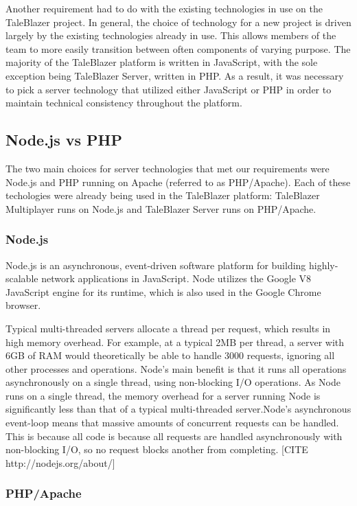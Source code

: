 Another requirement had to do with the existing technologies in use on the TaleBlazer project. In general, the choice of technology for a new project is driven largely by the existing technologies already in use. This allows members of the team to more easily transition between often components of varying purpose. The majority of the TaleBlazer platform is written in JavaScript, with the sole exception being TaleBlazer Server, written in PHP. As a result, it was necessary to pick a server technology that utilized either JavaScript or PHP in order to maintain technical consistency throughout the platform. 

\subsection{Node.js vs PHP}

The two main choices for server technologies that met our requirements were Node.js and PHP running on Apache (referred to as PHP/Apache). Each of these techologies were already being used in the TaleBlazer platform: TaleBlazer Multiplayer runs on Node.js and TaleBlazer Server runs on PHP/Apache. 

\subsubsection{Node.js}

Node.js is an asynchronous, event-driven software platform for building highly-scalable network applications in JavaScript. Node utilizes the Google V8 JavaScript engine for its runtime, which is also used in the Google Chrome browser. 

Typical multi-threaded servers allocate a thread per request, which results in high memory overhead. For example, at a typical 2MB per thread, a server with 6GB of RAM would theoretically be able to handle 3000 requests, ignoring all other processes and operations. Node's main benefit is that it runs all operations asynchronously on a single thread, using non-blocking I/O operations. As Node runs on a single thread, the memory overhead for a server running Node is significantly less than that of a typical multi-threaded server.Node's asynchronous event-loop means that massive amounts of concurrent requests can be handled. This is because all code is because all requests are handled asynchronously with non-blocking I/O, so no request blocks another from completing. [CITE http://nodejs.org/about/]

\subsubsection{PHP/Apache}

